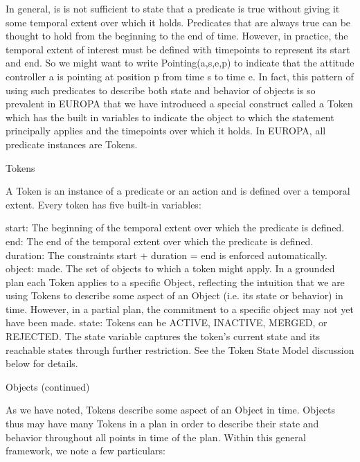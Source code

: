 In general, is is not sufficient to state that a predicate is true without giving it some temporal extent over which it holds. Predicates that are always true can be thought to hold from the beginning to the end of time. However, in practice, the temporal extent of interest must be defined with timepoints to represent its start and end. So we might want to write Pointing(a,s,e,p) to indicate that the attitude controller a is pointing at position p from time s to time e. In fact, this pattern of using such predicates to describe both state and behavior of objects is so prevalent in EUROPA that we have introduced a special construct called a Token which has the built in variables to indicate the object to which the statement principally applies and the timepoints over which it holds. In EUROPA, all predicate instances are Tokens.


Tokens

A Token is an instance of a predicate or an action and is defined over a temporal extent. Every token has five built-in variables:

    start: The beginning of the temporal extent over which the predicate is defined.
    end: The end of the temporal extent over which the predicate is defined.
    duration: The constraints start + duration = end is enforced automatically.
    object: made. The set of objects to which a token might apply. In a grounded plan each Token applies to a specific Object, reflecting the intuition that we are using Tokens to describe some aspect of an Object (i.e. its state or behavior) in time. However, in a partial plan, the commitment to a specific object may not yet have been made.
    state: Tokens can be ACTIVE, INACTIVE, MERGED, or REJECTED. The state variable captures the token's current state and its reachable states through further restriction. See the Token State Model discussion below for details. 

Objects (continued)

As we have noted, Tokens describe some aspect of an Object in time. Objects thus may have many Tokens in a plan in order to describe their state and behavior throughout all points in time of the plan. Within this general framework, we note a few particulars:

